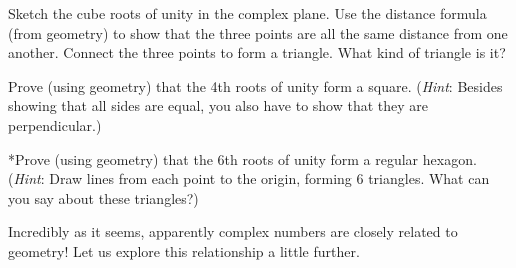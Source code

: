 \begin{exercise}{52}
Sketch the cube roots of unity in the complex plane. Use the distance formula (from geometry) to show that the three points are all the same distance from one another.  Connect the three points to form a triangle. What kind of triangle is it?
\end{exercise}

\begin{exercise}{53}
Prove (using geometry) that the 4th roots of unity form a square. (\emph{Hint}: Besides showing that all sides are equal, you also have to show that they are perpendicular.)
\end{exercise}

\begin{exercise}{54}
*Prove (using geometry) that the 6th roots of unity form a regular hexagon. (\emph{Hint}: Draw lines from each point to the origin, forming 6 triangles. What can you say about these triangles?)
\end{exercise}

Incredibly as it seems, apparently complex numbers are closely related to geometry! Let us explore this relationship a little further.

